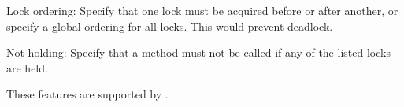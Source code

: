 Lock ordering:  Specify that one lock must be acquired before or after
another, or specify a global ordering for all locks.  This would prevent
deadlock.

Not-holding:  Specify that a method must not be called if any of the listed
locks are held.

These features are supported by 
.


